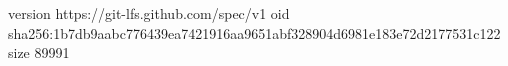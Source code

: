 version https://git-lfs.github.com/spec/v1
oid sha256:1b7db9aabc776439ea7421916aa9651abf328904d6981e183e72d2177531c122
size 89991
